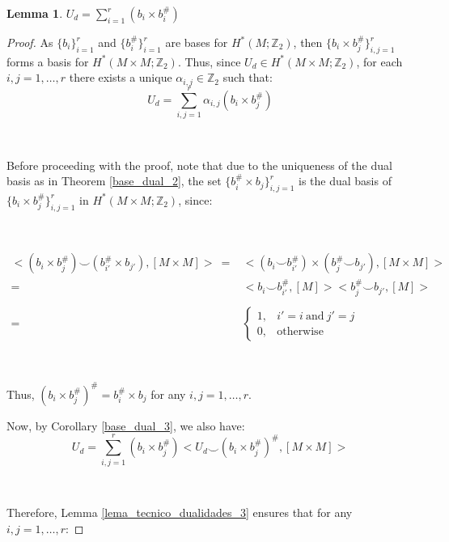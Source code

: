 \documentclass[12pt,oneside]{book}
\newtheorem{lem}    {Lemma}[chapter]
\newcommand{\ds}{\displaystyle}
\newcommand{\Z}{\mathbb{Z}}
\newcommand{\ccup}{\smile}
\begin{document}
    \begin{lem}\label{u_base_dual}
    	$U_{d} = \ds\sum_{i=1}^{r} (b_{i} \times b_{i}^{\#})$
    \end{lem}
    \begin{proof}

        As $\{b_{i}\}_{i=1}^{r}$ and $\{b^{\#}_{i}\}_{i=1}^{r}$ are bases for $H^{*}(M; \Z_{2})$, then 
        $\{b_{i} \times b_{j}^{\#}\}_{i,j=1}^{r}$ forms a basis for $H^{*}(M \times M; \Z_{2})$. Thus, since 
        $U_{d} \in H^{*}(M \times M; \Z_{2})$, for each $i,j = 1, \ldots, r$ there exists a unique $\alpha_{i,j} \in \Z_{2}$ such that:
        $$ U_{d} = \ds\sum_{i,j=1}^{r} \alpha_{i,j} (b_{i} \times b_{j}^{\#}) $$

        \

        Before proceeding with the proof, note that due to the uniqueness of the dual basis as in Theorem \ref{base_dual_2}, 
        the set $\{b^{\#}_{i} \times b_{j}\}_{i,j=1}^{r}$ is the dual basis of $\{b_{i} \times b_{j}^{\#}\}_{i,j=1}^{r}$ in 
        $H^{*}(M \times M; \Z_{2})$, since:

        \

        $ \begin{array}{rl}
        	<(b_{i} \times b_{j}^{\#}) \ccup (b_{i'}^{\#} \times b_{j'}), [M \times M]> \ = & <(b_{i} \ccup b_{i'}^{\#}) \times (b_{j}^{\#} \ccup b_{j'}), [M \times M]> \\
        	= & <b_{i} \ccup b_{i'}^{\#}, [M]> <b_{j}^{\#} \ccup b_{j'}, [M]> \\
             & \\
        	= & \left\{ \begin{array}{cl}
        		1, & i' = i \ \text{and} \ j' = j \\
        		0, & \text{otherwise}
        	\end{array} \right.
        \end{array} $

        \

        Thus, $(b_{i} \times b_{j}^{\#})^{\#} = b_{i}^{\#} \times b_{j}$ for any $i,j=1,\ldots,r$.

        Now, by Corollary \ref{base_dual_3}, we also have:
        $$ U_{d} = \ds\sum_{i,j=1}^{r} (b_{i} \times b_{j}^{\#}) < U_{d} \ccup (b_{i} \times b_{j}^{\#})^{\#}, [M \times M] > $$

        \

        Therefore, Lemma \ref{lema_tecnico_dualidades_3} ensures that for any $i,j=1,\ldots,r$:


\end{proof}
\end{document}
